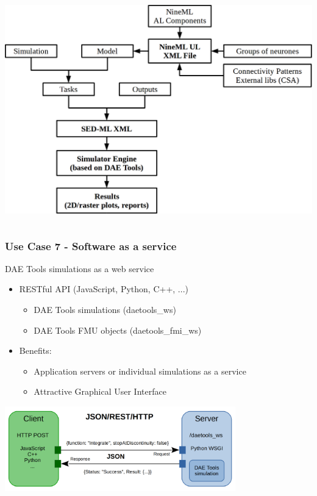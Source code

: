 \documentclass[compress,newPxFont,sthlmFooter]{beamer}
\begin{document}
\begin{frame}[plain]
\begin{columns}[c]
      \begin{column}{0.45\paperwidth}
        \begin{center}
            \includegraphics[align=c, width=\textwidth]{nineml_ris.png}
        \end{center}
      \end{column}
    \end{columns}
\end{frame}

\begin{frame}[plain]
\frametitle{Use Case 7 - Software as a service}
    \begin{center}
        \alert{DAE Tools simulations as a web service}
    \end{center}   
    
    \small {
    \begin{itemize}
        \item RESTful API (JavaScript, Python, C++, ...)
            \begin{itemize}
                \item DAE Tools simulations (daetools\_ws)
                \item DAE Tools FMU objects (daetools\_fmi\_ws)
            \end{itemize}
        \item Benefits:
            \begin{itemize}
                \item Application servers or individual simulations as a service
                \item Attractive Graphical User Interface
            \end{itemize}
    \end{itemize}
    }
    \begin{center}
        \includegraphics[align=c, width=0.75\textwidth]{daetools_web_service.png}
    \end{center}
\end{frame}
\end{document}
